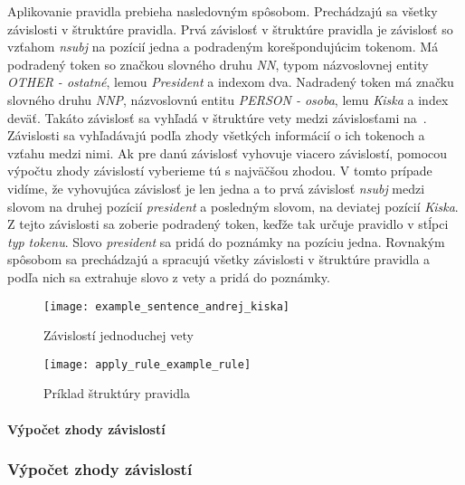 Aplikovanie pravidla prebieha nasledovným spôsobom. Prechádzajú sa všetky závislosti v štruktúre pravidla. Prvá závislosť v štruktúre pravidla je závislosť so vzťahom \textit{nsubj} na pozícií jedna a podradeným korešpondujúcim tokenom. Má podradený token so značkou slovného druhu \textit{NN}, typom názvoslovnej entity \textit{OTHER - ostatné}, lemou \textit{President} a indexom dva. Nadradený token má značku slovného druhu \textit{NNP}, názvoslovnú entitu \textit{PERSON - osoba}, lemu \textit{Kiska} a index deväť. Takáto závislosť sa vyhľadá v štruktúre vety medzi závislosťami na~. Závislosti sa vyhľadávajú podľa zhody všetkých informácií o ich tokenoch a vzťahu medzi nimi. Ak pre danú závislosť vyhovuje viacero závislostí, pomocou výpočtu zhody závislostí vyberieme tú s najväčšou zhodou. V tomto prípade vidíme, že vyhovujúca závislosť je len jedna a to prvá závislosť \textit{nsubj} medzi slovom na druhej pozícií \textit{president} a posledným slovom, na deviatej pozícií \textit{Kiska}. Z tejto závislosti sa zoberie podradený token, keďže tak určuje pravidlo v stĺpci \textit{typ tokenu}. Slovo \textit{president} sa pridá do poznámky na pozíciu jedna. Rovnakým spôsobom sa prechádzajú a spracujú všetky závislosti v štruktúre pravidla a podľa nich sa extrahuje slovo z vety a pridá do poznámky.

\begin{figure}[H]
	\begin{center}\texttt{[image: example\_sentence\_andrej\_kiska]}\end{center}
	\caption[Závislostí jednoduchej vety]{Závislostí jednoduchej vety}\label{fig:example_sentence_andrej_kiska}
\end{figure}

\begin{figure}[H]
	\begin{center}\texttt{[image: apply\_rule\_example\_rule]}\end{center}
	\caption[Príklad štruktúry pravidla]{Príklad štruktúry pravidla}\label{fig:apply_rule_example_rule}
\end{figure}

%
%
{
	\paragraph{Výpočet zhody závislostí}
}
{
	\subsubsection{Výpočet zhody závislostí}
}
\label{paragraph:dependency_match}


